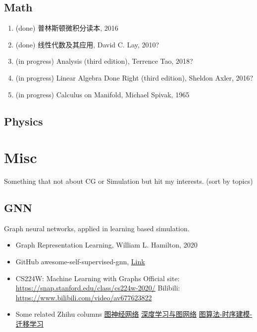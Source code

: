 \documentclass{article}
\newcommand{\done}{
    (done)
}
\newcommand{\inprogress}{
    (in progress)
}
\begin{document}
\subsection{Math}
\begin{enumerate}
    \item \done 普林斯顿微积分读本, 2016
    \item \done 线性代数及其应用, David C. Lay, 2010?
    \item \inprogress Analysis (third edition), Terrence Tao, 2018?
    \item \inprogress Linear Algebra Done Right (third edition), Sheldon Axler, 2016?
    \item \inprogress Calculus on Manifold, Michael Spivak, 1965
\end{enumerate}
\subsection{Physics}

\section{Misc}
\par Something that not about CG or Simulation but hit my interests. (sort by topics)
\subsection{GNN}
\par Graph neural networks, applied in learning based simulation.
\begin{itemize}
    \item Graph Representation Learning, William L. Hamilton, 2020
    \item GitHub awesome-self-supervised-gnn, \href{https://github.com/ChandlerBang/awesome-self-supervised-gnn}{Link}
    \item CS224W: Machine Learning with Graphs \newline Official site: \href{https://snap.stanford.edu/class/cs224w-2020/}{https://snap.stanford.edu/class/cs224w-2020/} \newline Bilibili: \href{https://www.bilibili.com/video/av677623822}{https://www.bilibili.com/video/av677623822}
    \item Some related Zhihu columns \newline \href{https://www.zhihu.com/column/c_1330471030893662208}{图神经网络} \newline \href{https://www.zhihu.com/column/marlin}{深度学习与图网络} \newline \href{https://www.zhihu.com/column/c_1115285924917047296}{图算法-时序建模-迁移学习}
\end{itemize}
\end{document}
